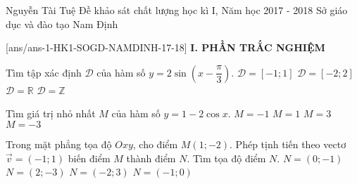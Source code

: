 
	\begin{name}
		{Nguyễn Tài Tuệ}
		{Đề khảo sát chất lượng  học kì I, Năm học 2017 - 2018 Sở giáo dục và đào tạo Nam Định}
	\end{name}
	\setcounter{ex}{0}\setcounter{bt}{0}
	[ans/ans-1-HK1-SOGD-NAMDINH-17-18]
\noindent\textbf{I. PHẦN TRẮC NGHIỆM}
\begin{ex}%
Tìm tập xác định $\mathscr{D}$ của hàm số $y=2\sin \left (x-\dfrac{\pi}{3}\right )$.
\choice
{$\mathscr{D}=\left [ -1;1\right ]$}
{$\mathscr{D}=\left [-2;2\right ]$}
{\True $\mathscr{D}=\mathbb{R}$}
{$\mathscr{D}=\mathbb{Z}$}

\end{ex}
\begin{ex}%
Tìm giá trị nhỏ nhất $M$ của hàm số $y=1-2\cos x$.
 \choice 
{\True $M=-1$}
{$M=1$}
{$M=3$}
{$M =-3$}

\end{ex}
\begin{ex}%
Trong mặt phẳng tọa độ $Oxy$, cho điểm $M(1;-2)$. Phép tịnh tiến theo vectơ $\vec{v}=(-1;1)$ biến điểm $M$ thành điểm $N$. Tìm tọa độ điểm $N$.
 \choice 
{\True $N=(0;-1)$}
{$N=(2;-3)$}
{$N=(-2;3)$}
{$N=(-1;0)$}

\end{ex}
